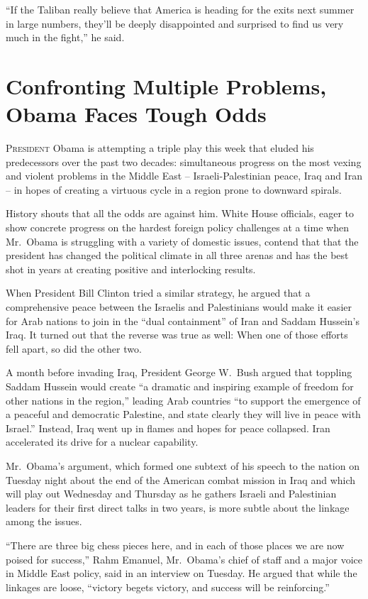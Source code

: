 ﻿\documentclass[12pt]{article}
\begin{document}
``If the Taliban really believe that America is heading for the exits next summer in large numbers,
they'll be deeply disappointed and surprised to find us very much in the fight,'' he said.

\pagebreak
\section{Confronting Multiple Problems, Obama Faces Tough Odds}

\lettrine{P}{resident} Obama is attempting a triple play this week that
eluded his predecessors over the past two decades: simultaneous progress on the most vexing and
violent problems in the Middle East -- Israeli-Palestinian peace, Iraq and Iran -- in hopes of
creating a virtuous cycle in a region prone to downward spirals.

History shouts that all the odds are against him. White House officials, eager to show concrete
progress on the hardest foreign policy challenges at a time when Mr.~Obama is struggling with a
variety of domestic issues, contend that that the president has changed the political climate in all
three arenas and has the best shot in years at creating positive and interlocking results.

When President Bill Clinton tried a similar strategy, he argued that a comprehensive peace between
the Israelis and Palestinians would make it easier for Arab nations to join in the ``dual
containment'' of Iran and Saddam Hussein's Iraq. It turned out that the reverse was true as well:
When one of those efforts fell apart, so did the other two.

A month before invading Iraq, President George W.~Bush argued that toppling Saddam Hussein would
create ``a dramatic and inspiring example of freedom for other nations in the region,'' leading Arab
countries ``to support the emergence of a peaceful and democratic Palestine, and state clearly they
will live in peace with Israel.'' Instead, Iraq went up in flames and hopes for peace collapsed.
Iran accelerated its drive for a nuclear capability.

Mr.~Obama's argument, which formed one subtext of his speech to the nation on Tuesday night about
the end of the American combat mission in Iraq and which will play out Wednesday and Thursday as he
gathers Israeli and Palestinian leaders for their first direct talks in two years, is more subtle
about the linkage among the issues.

``There are three big chess pieces here, and in each of those places we are now poised for
success,'' Rahm Emanuel, Mr.~Obama's chief of staff and a major voice in Middle East policy, said in
an interview on Tuesday. He argued that while the linkages are loose, ``victory begets victory, and
success will be reinforcing.''
\end{document}
